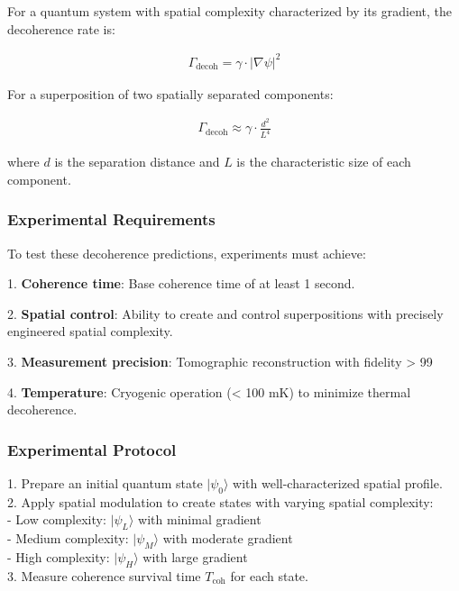 \documentclass[11pt,english,twoside]{article}
\begin{document}
For a quantum system with spatial complexity characterized by its gradient, the decoherence rate is:

\begin{align}
\Gamma_{\text{decoh}} = \gamma \cdot |\nabla\psi|^2
\end{align}

For a superposition of two spatially separated components:

\begin{align}
\Gamma_{\text{decoh}} \approx \gamma \cdot \frac{d^2}{L^4}
\end{align}

where $d$ is the separation distance and $L$ is the characteristic size of each component.

\subsubsection{Experimental Requirements}

To test these decoherence predictions, experiments must achieve:

1. \textbf{Coherence time}: Base coherence time of at least 1 second.

2. \textbf{Spatial control}: Ability to create and control superpositions with precisely engineered spatial complexity.

3. \textbf{Measurement precision}: Tomographic reconstruction with fidelity > 99%

4. \textbf{Temperature}: Cryogenic operation (< 100 mK) to minimize thermal decoherence.

\subsubsection{Experimental Protocol}

1. Prepare an initial quantum state $|\psi_0\rangle$ with well-characterized spatial profile.\\

2. Apply spatial modulation to create states with varying spatial complexity:\\
   - Low complexity: $|\psi_L\rangle$ with minimal gradient\\
   - Medium complexity: $|\psi_M\rangle$ with moderate gradient\\
   - High complexity: $|\psi_H\rangle$ with large gradient\\

3. Measure coherence survival time $T_{\text{coh}}$ for each state.\\
\end{document}

